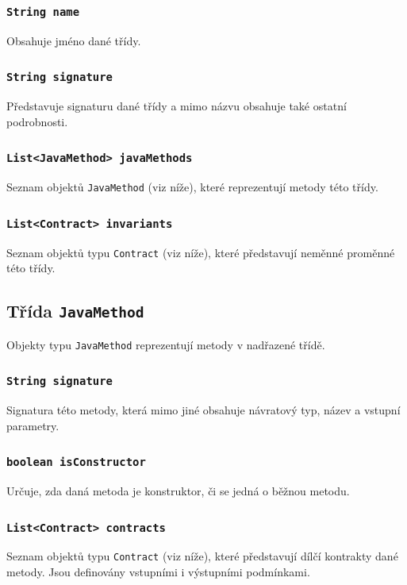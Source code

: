 				\subsubsection{\texttt{String name}}				
					Obsahuje jméno dané třídy.
			
				\subsubsection{\texttt{String signature}}				
					Představuje signaturu dané třídy a mimo názvu obsahuje také ostatní podrobnosti.
					
				\subsubsection{\texttt{List<JavaMethod> javaMethods}}
					Seznam objektů \texttt{JavaMethod} (viz níže), které reprezentují metody této třídy.
					
				\subsubsection{\texttt{List<Contract> invariants}}
					Seznam objektů typu \texttt{Contract} (viz níže), které představují neměnné proměnné této třídy.
			
			
			\subsection{Třída \texttt{JavaMethod}}
				Objekty typu \texttt{JavaMethod} reprezentují metody v nadřazené třídě.
				
				\subsubsection{\texttt{String signature}}
					Signatura této metody, která mimo jiné obsahuje návratový typ, název a vstupní parametry.
					
				\subsubsection{\texttt{boolean isConstructor}}
					Určuje, zda daná metoda je konstruktor, či se jedná o běžnou metodu.
					
				\subsubsection{\texttt{List<Contract> contracts}}
					Seznam objektů typu \texttt{Contract} (viz níže), které představují dílčí kontrakty dané metody. Jsou definovány vstupními i výstupními podmínkami.
						
